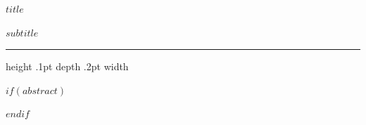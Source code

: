 \vspace*{0.5cm}

\begin{center}
\centering\textbf{\sffamily\LARGE $title$} 

\centering\textbf{\sffamily\large $subtitle$}
\end{center}

\bigskip
\hrule height .1pt depth .2pt width \textwidth

\bigskip

$if(abstract)$
\begin{abstract}
$abstract$
\end{abstract}
$endif$
